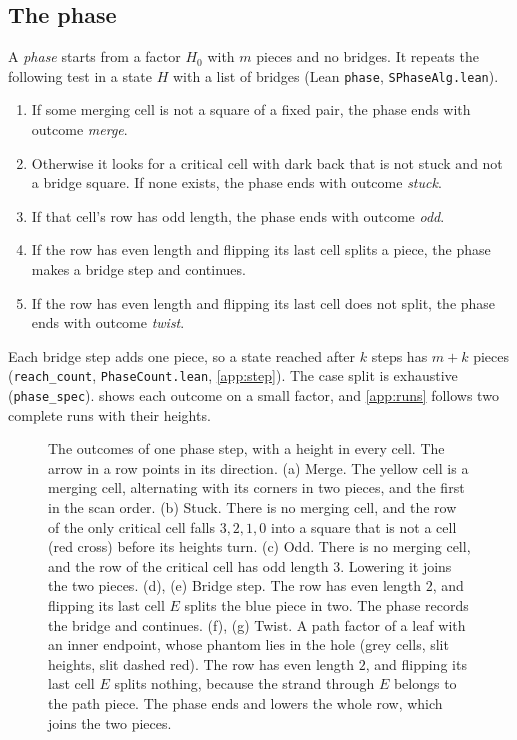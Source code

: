 \documentclass[11pt]{article}
\theoremstyle{plain}
\theoremstyle{definition}
\theoremstyle{remark}
\newcommand{\lean}[1]{\texttt{#1}}
\begin{document}
\subsection{The phase}

A \emph{phase} starts from a factor $H_0$ with $m$ pieces and no bridges.
It repeats the following test in a state $H$ with a list of bridges (Lean \lean{phase},
\lean{SPhaseAlg.lean}).
\begin{enumerate}
\item If some merging cell is not a square of a fixed pair, the phase ends with outcome
  \emph{merge}.
\item Otherwise it looks for a critical cell with dark back that is not stuck and not a bridge square.
  If none exists, the phase ends with outcome \emph{stuck}.
\item If that cell's row has odd length, the phase ends with outcome \emph{odd}.
\item If the row has even length and flipping its last cell splits a piece, the phase makes a
  bridge step and continues.
\item If the row has even length and flipping its last cell does not split, the phase ends with
  outcome \emph{twist}.
\end{enumerate}
Each bridge step adds one piece, so a state reached after $k$ steps has $m+k$ pieces
(\lean{reach\_count}, \lean{PhaseCount.lean}, \cref{app:step}).
The case split is exhaustive (\lean{phase\_spec}).
 shows each outcome on a small factor, and \cref{app:runs} follows two complete
runs with their heights.

\begin{figure}[!htbp]
\centering

\caption{The outcomes of one phase step, with a height in every cell.
The arrow in a row points in its direction.
(a) Merge.
The yellow cell is a merging cell, alternating with its corners in two pieces, and the first in
the scan order.
(b) Stuck.
There is no merging cell, and the row of the only critical cell falls $3,2,1,0$ into a square that
is not a cell (red cross) before its heights turn.
(c) Odd.
There is no merging cell, and the row of the critical cell has odd length $3$.
Lowering it joins the two pieces.
(d), (e) Bridge step.
The row has even length $2$, and flipping its last cell $E$ splits the blue piece in two.
The phase records the bridge and continues.
(f), (g) Twist.
A path factor of a leaf with an inner endpoint, whose phantom lies in the hole (grey cells, slit
heights, slit dashed red).
The row has even length $2$, and flipping its last cell $E$ splits nothing, because the strand
through $E$ belongs to the path piece.
The phase ends and lowers the whole row, which joins the two pieces.}
\label{fig:phase}
\end{figure}
\end{document}
